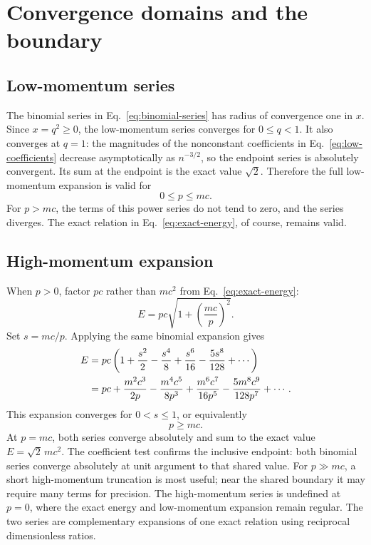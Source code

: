 \documentclass[12pt]{article}
\begin{document}
\section{Convergence domains and the boundary}

\subsection{Low-momentum series}

The binomial series in Eq.~\eqref{eq:binomial-series} has radius of convergence one in $x$. Since $x=q^2\geq0$, the low-momentum series converges for $0\leq q<1$. It also converges at $q=1$: the magnitudes of the nonconstant coefficients in Eq.~\eqref{eq:low-coefficients} decrease asymptotically as $n^{-3/2}$, so the endpoint series is absolutely convergent. Its sum at the endpoint is the exact value $\sqrt{2}$. Therefore the full low-momentum expansion is valid for
\begin{equation}
  0\leq p\leq mc.
  \label{eq:low-domain}
\end{equation}
For $p>mc$, the terms of this power series do not tend to zero, and the series diverges. The exact relation in Eq.~\eqref{eq:exact-energy}, of course, remains valid.

\subsection{High-momentum expansion}

When $p>0$, factor $pc$ rather than $mc^2$ from Eq.~\eqref{eq:exact-energy}:
\begin{equation}
  E=pc\sqrt{1+\left(\frac{mc}{p}\right)^2}.
  \label{eq:high-factorization}
\end{equation}
Set $s=mc/p$. Applying the same binomial expansion gives
\begin{align}
  E
  &=pc\left(1+\frac{s^2}{2}-\frac{s^4}{8}
       +\frac{s^6}{16}-\frac{5s^8}{128}+\cdots\right) \notag\\
  &=pc+\frac{m^2c^3}{2p}-\frac{m^4c^5}{8p^3}
       +\frac{m^6c^7}{16p^5}-\frac{5m^8c^9}{128p^7}+\cdots.
  \label{eq:high-momentum-series}
\end{align}
This expansion converges for $0<s\leq1$, or equivalently
\begin{equation}
  p\geq mc.
  \label{eq:high-domain}
\end{equation}
At $p=mc$, both series converge absolutely and sum to the exact value $E=\sqrt{2}\,mc^2$. The coefficient test confirms the inclusive endpoint: both binomial series converge absolutely at unit argument to that shared value. For $p\gg mc$, a short high-momentum truncation is most useful; near the shared boundary it may require many terms for precision. The high-momentum series is undefined at $p=0$, where the exact energy and low-momentum expansion remain regular. The two series are complementary expansions of one exact relation using reciprocal dimensionless ratios.
\end{document}
